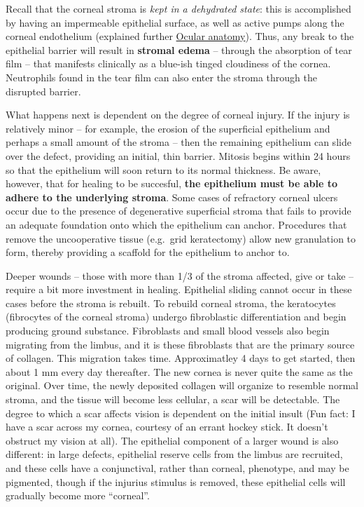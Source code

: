 \documentclass[openany]{article}
\begin{document}
Recall that the corneal stroma is \emph{kept in a dehydrated state}:
this is accomplished by having an impermeable epithelial surface, as
well as active pumps along the corneal endothelium (explained further
\protect\hyperlink{ocular-anatomy}{Ocular anatomy}). Thus, any break to
the epithelial barrier will result in \textbf{stromal edema} -- through
the absorption of tear film -- that manifests clinically as a blue-ish
tinged cloudiness of the cornea. Neutrophils found in the tear film can
also enter the stroma through the disrupted barrier.

What happens next is dependent on the degree of corneal injury. If the
injury is relatively minor -- for example, the erosion of the
superficial epithelium and perhaps a small amount of the stroma -- then
the remaining epithelium can slide over the defect, providing an
initial, thin barrier. Mitosis begins within 24 hours so that the
epithelium will soon return to its normal thickness. Be aware, however,
that for healing to be succesful, \textbf{the epithelium must be able to
adhere to the underlying stroma}. Some cases of refractory corneal
ulcers occur due to the presence of degenerative superficial stroma that
fails to provide an adequate foundation onto which the epithelium can
anchor. Procedures that remove the uncooperative tissue (e.g.~grid
keratectomy) allow new granulation to form, thereby providing a scaffold
for the epithelium to anchor to.

Deeper wounds -- those with more than 1/3 of the stroma affected, give
or take -- require a bit more investment in healing. Epithelial sliding
cannot occur in these cases before the stroma is rebuilt. To rebuild
corneal stroma, the keratocytes (fibrocytes of the corneal stroma)
undergo fibroblastic differentiation and begin producing ground
substance. Fibroblasts and small blood vessels also begin migrating from
the limbus, and it is these fibroblasts that are the primary source of
collagen. This migration takes time. Approximatley 4 days to get
started, then about 1 mm every day thereafter. The new cornea is never
quite the same as the original. Over time, the newly deposited collagen
will organize to resemble normal stroma, and the tissue will become less
cellular, a scar will be detectable. The degree to which a scar affects
vision is dependent on the initial insult (Fun fact: I have a scar
across my cornea, courtesy of an errant hockey stick. It doesn't
obstruct my vision at all). The epithelial component of a larger wound
is also different: in large defects, epithelial reserve cells from the
limbus are recruited, and these cells have a conjunctival, rather than
corneal, phenotype, and may be pigmented, though if the injurius
stimulus is removed, these epithelial cells will gradually become more
``corneal''.
\end{document}
